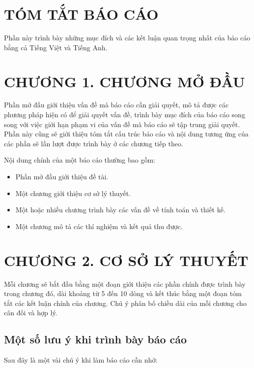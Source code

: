 \documentclass{article} %
\begin{document}
\listoftables %
\cleardoublepage
\section*{TÓM TẮT BÁO CÁO}
Phần này trình bày những mục đích và các kết luận quan trọng nhất của báo cáo bằng cả Tiếng Việt và Tiếng Anh. 
\cleardoublepage
 
\section*{CHƯƠNG 1. CHƯƠNG MỞ ĐẦU}
Phần mở đầu giới thiệu vấn đề mà báo cáo cần giải quyết, mô tả được các phương pháp hiện có để giải quyết vấn đề,
trình bày mục đích của báo cáo song song với việc giới hạn phạm vi của vấn đề mà báo cáo sẽ tập trung giải quyết.
Phần này cũng sẽ giới thiệu tóm tắt cấu trúc báo cáo và nội dung tương ứng của các phần sẽ lần lượt được trình bày
ở các chương tiếp theo.

Nội dung chính của một báo cáo thường bao gồm: 
\begin{itemize}
    \item Phần mở đầu giới thiệu đề tài.
    \item Một chương giới thiệu cơ sở lý thuyết.
    \item Một hoặc nhiều chương trình bày các vấn đề về tính toán và thiết kế.
    \item Một chương mô tả các thí nghiệm và kết quả thu được.
\end{itemize}
\newpage

\section*{CHƯƠNG 2. CƠ SỞ LÝ THUYẾT}
\setcounter{section}{2}
\setcounter{subsection}{0}
Mỗi chương sẽ bắt đầu bằng một đoạn giới thiệu các phần chính được trình bày  trong chương đó, dài khoảng từ 5 đến 10
dòng và kết thúc bằng một đoạn tóm tắt các kết luận chính của chương. Chú ý phân bố chiều dài của mỗi chương cho cân
đối và hợp lý.
\subsection{Một số lưu ý khi trình bày báo cáo}
Sau đây là một vài chú ý khi làm báo cáo cần nhớ:
\end{document}
